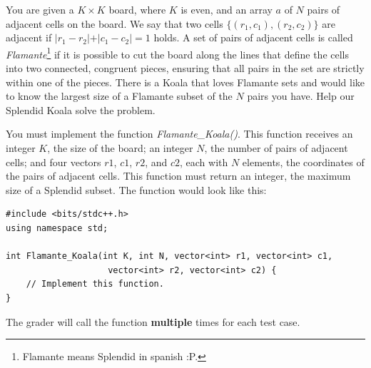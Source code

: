 \documentclass[12pt]{scrartcl}
\begin{document}
    
    
    \vspace{10pt}

    

        You are given a $K \times K$ board, where $K$ is even, and an array $a$ of $N$ pairs of adjacent cells on the board. We say that two cells $\{(r_1, c_1), (r_2, c_2)\}$ are adjacent if $\lvert r_1 - r_2 \lvert + \lvert c_1 - c_2 \lvert = 1$ holds. A set of pairs of adjacent cells is called {\itshape Flamante}\footnote{Flamante means Splendid in spanish :P.} if it is possible to cut the board along the lines that define the cells into two connected, congruent pieces, ensuring that all pairs in the set are strictly within one of the pieces. There is a Koala that loves Flamante sets and would like to know the largest size of a Flamante subset of the $N$ pairs you have. Help our Splendid Koala solve the problem.
        

       You must implement the function {\itshape Flamante\_Koala()}. This function receives an integer $K$, the size of the board; an integer $N$, the number of pairs of adjacent cells; and four vectors $r1$, $c1$, $r2$, and $c2$, each with $N$ elements, the coordinates of the pairs of adjacent cells. This function must return an integer, the maximum size of a Splendid subset. 
        The function would look like this:

\begin{verbatim}
#include <bits/stdc++.h>
using namespace std;

int Flamante_Koala(int K, int N, vector<int> r1, vector<int> c1,
                    vector<int> r2, vector<int> c2) {
    // Implement this function.
}
\end{verbatim}

    The grader will call the function \textbf{multiple} times for each test case.

    
\end{document}
